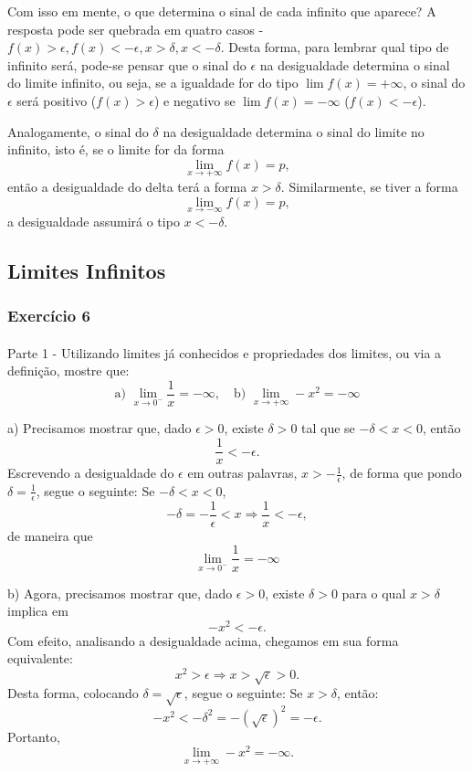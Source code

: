 \documentclass[Calculus1/exercícios_de_cálculo.tex]{subfiles}
\begin{document}
Com isso em mente, o que determina o sinal de cada infinito que aparece? A resposta pode ser quebrada em quatro casos - $f(x) > \epsilon, f(x) < -\epsilon, x > \delta, x < -\delta$. Desta forma, para lembrar qual tipo de infinito será, pode-se pensar que o sinal do $\epsilon$ na desigualdade determina o sinal do limite infinito, ou seja, se a igualdade for do tipo $\lim f(x) = +\infty$, o sinal do $\epsilon$ será positivo ($f(x) > \epsilon$) e negativo se $\lim f(x) = -\infty$ ($f(x) < -\epsilon$).

Analogamente, o sinal do $\delta$ na desigualdade determina o sinal do limite no infinito, isto é, se o limite for da forma
$$
	\lim_{x\to+\infty} f(x) = p,
$$
então a desigualdade do delta terá a forma $x > \delta$. Similarmente, se tiver a forma
$$
	\lim_{x\to-\infty} f(x) = p,
$$
a desigualdade assumirá o tipo $x < -\delta.$

\subsection{Limites Infinitos}
\subsubsection{Exercício 6}
\paragraph{}Parte 1 - Utilizando limites já conhecidos e propriedades dos limites, ou via a definição, mostre que:
$$
	\text{a) }\lim_{x\to{0^{-}}}{\frac{1}{x}} = -\infty, \quad \text{b) }\lim_{x\to+\infty} -x^2 = -\infty
$$
\begin{sol*}
	a) Precisamos mostrar que, dado $\epsilon > 0$, existe $\delta > 0$ tal que se $-\delta < x < 0$, então
	$$
		\frac{1}{x} < -\epsilon.
	$$
	Escrevendo a desigualdade do $\epsilon$ em outras palavras, $x > -\frac{1}{\epsilon}$, de forma que pondo $\delta = \frac{1}{\epsilon}$, segue o seguinte: Se $-\delta < x < 0$,
	$$
		-\delta  = -\frac{1}{\epsilon} < x \Rightarrow \frac{1}{x} < -\epsilon,
	$$
	de maneira que
	$$
		\lim_{x\to{0^{-}}}{\frac{1}{x}} = -\infty
	$$

	b) Agora, precisamos mostrar que, dado $\epsilon > 0$, existe $\delta > 0$ para o qual $x > \delta$ implica em
	$$
		-x^2 < -\epsilon.
	$$
	Com efeito, analisando a desigualdade acima, chegamos em sua forma equivalente:
	$$
		x^2 > \epsilon\Rightarrow x > \sqrt{\epsilon} > 0.
	$$
	Desta forma, colocando $\delta = \sqrt{\epsilon}$, segue o seguinte: Se $x > \delta$, então:
	$$
		-x^2 < -\delta^2 = -(\sqrt{\epsilon})^2 = -\epsilon.
	$$
	Portanto,
	$$
		\lim_{x\to+\infty} -x^2 = -\infty.
	$$
	\qedsymbol
\end{sol*}
\end{document}
